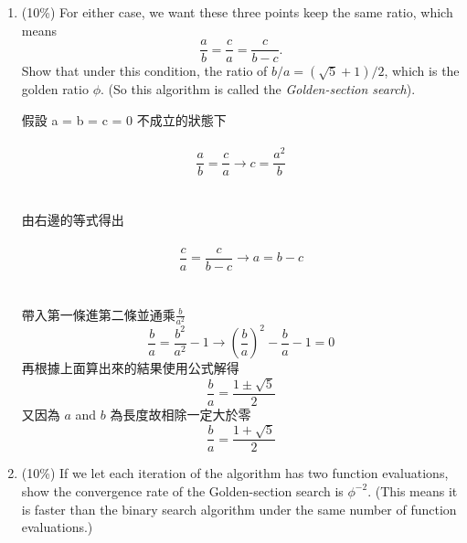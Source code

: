 \documentclass[a4paper,10pt]{article}
\begin{document}
\begin{enumerate}
\begin{enumerate}
{\color{blue}
\begin{CJK*}{UTF8}{bsmi}
根據unimodel的性質，$\exists x \in [x_1,x_3]$ 裡面一定有極值，表示只要x往極值移動時，一定為單調遞增或單調遞減\\
反證法:\\
若$f(x_4)= f_{4a}$，假設此函數在$\exists x_m \in [x_4,x_3]$之間有極值，但這就違反了unimodel的定義，因為無法單調遞增或遞減，其不是唯一\\
local minimum。\\
若$f(x_4)= f_{4b}$，假設此函數在$\exists x_m \in [x_1,x_2]$有極值，但這就違反unimodel的性質，因為無法單調遞增或遞減，其不是唯一的local minimum
\end{CJK*}

}
    \item (10\%) For either case, we want these three points keep the same ratio, which means
    $$\frac{a}{b} = \frac{c}{a} = \frac{c}{b-c}.$$
    Show that under this condition, the ratio of $b/a=(\sqrt{5}+1)/2$, which is the golden ratio $\phi$. (So this algorithm is called the \emph{Golden-section search}).
    
{\color{blue} 

\begin{CJK*}{UTF8}{bsmi}
假設 a = b = c = 0 不成立的狀態下\\\\
$$\frac{a}{b} = \frac{c}{a}
\rightarrow c = \frac{a^{2}}{b}$$\\\\

由右邊的等式得出\\\\
$$\frac{c}{a} = \frac{c}{b-c}
\rightarrow  a = b - c $$\\\\

帶入第一條進第二條並通乘$\frac{b}{a^{2}}$
$$\frac{b}{a} = \frac{b^{2}}{a^{2}} - 1 
\rightarrow (\frac{b}{a})^{2} - \frac{b}{a} - 1 = 0 $$
再根據上面算出來的結果使用公式解得
$$\frac{b}{a} = \frac{1 \pm  \sqrt{5}}{2}$$
又因為 $a$ and $b$ 為長度故相除一定大於零
$$\frac{b}{a} = \frac{1 +  \sqrt{5}}{2}$$
\end{CJK*}

}   
 
    \item (10\%) If we let each iteration of the algorithm has two function evaluations, show the convergence rate of the Golden-section search is  $\phi^{-2}$.  (This means it is faster than the binary search algorithm under the same number of function evaluations.)  
    \end{enumerate}


\end{enumerate}
\end{document}
